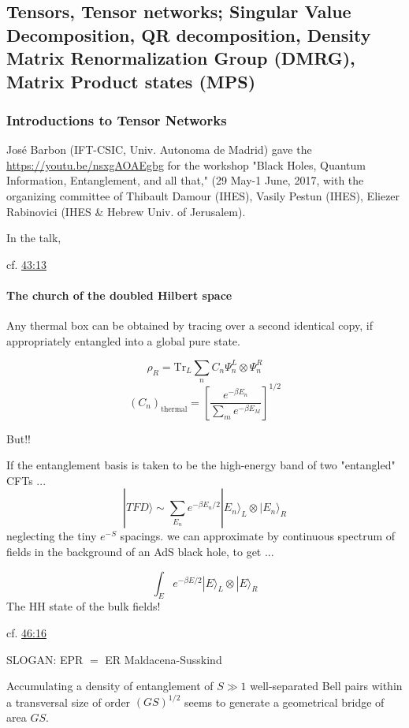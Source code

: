 \documentclass[10pt]{amsart}
\begin{document}
\begin{multicols*}{2}
\part{Tensors, Tensor networks; Singular Value Decomposition, QR decomposition, Density Matrix Renormalization Group (DMRG), Matrix Product states (MPS)}

\section{Introductions to Tensor Networks}

Jos\'{e} Barbon (IFT-CSIC, Univ. Autonoma de Madrid) gave the \href{Workshop introductory overview}{https://youtu.be/nsxgAOAEgbg} for the workshop "Black Holes, Quantum Information, Entanglement, and all that," (29 May-1 June, 2017, with the organizing committee of Thibault Damour (IHES), Vasily Pestun (IHES), Eliezer Rabinovici (IHES \& Hebrew Univ. of Jerusalem).  

In the talk, 


cf. \href{https://youtu.be/nsxgAOAEgbg?t=43m13s}{43:13}  

\subsection*{The church of the doubled Hilbert space}
 
Any thermal box can be obtained by tracing over a second identical copy, if appropriately entangled into a global pure state.  

\[
\rho_R = \text{Tr}_L \sum_n C_n \Psi_n^L \otimes \Psi_n^R
\]
\[
(C_n)_{\text{thermal}} = \left[ \frac{ e^{-\beta E_n} }{ \sum_m e^{-\beta E_M} } \right]^{1/2}
\]

But!!

If the entanglement basis is taken to be the high-energy band of two "entangled" CFTs ... 
\[
|TFD \rangle \sim \sum_{E_n} e^{-\beta E_n/2} | E_n \rangle_L \otimes | E_n \rangle_R
\]
neglecting the tiny $e^{-S}$ spacings. we can approximate by continuous spectrum of fields in the background of an AdS black hole, to get ... 
 
\[
\int_E e^{-\beta E/2} |E\rangle_L \otimes | E\rangle_R 
\]
The HH state of the bulk fields!  

cf. \href{https://youtu.be/nsxgAOAEgbg?t=46m16s}{46:16}

SLOGAN: EPR $=$ ER
Maldacena-Susskind  

Accumulating a density of entanglement of $S \gg 1$ well-separated Bell pairs within a transversal size of order $(GS)^{1/2}$  seems to generate a geometrical bridge of area $GS$.  




\end{multicols*}
\end{document}

